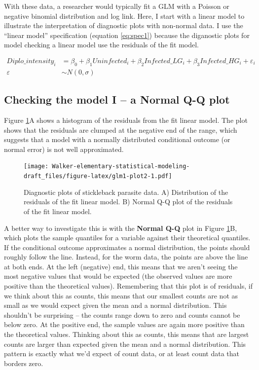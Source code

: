 \documentclass[]{book}
\begin{document}
With these data, a researcher would typically fit a GLM with a Poisson
or negative binomial distribution and log link. Here, I start with a
linear model to illustrate the interpretation of diagnostic plots with
non-normal data. I use the ``linear model'' specification (equation
\eqref{eq:spec1}) because the diganostic plots for model checking a linear
model use the residuals of the fit model.

\begin{align}
Diplo\_intensity_i &= \beta_0 + \beta_1 Uninfected_i + \beta_2 Infected\_LG_i + \beta_3 Infected\_HG_i + \varepsilon_i \\
\varepsilon &\sim N(0, \sigma)
\label{eq:worm-lm}
\end{align}

\subsection{Checking the model I -- a Normal Q-Q
plot}\label{checking-the-model-i-a-normal-q-q-plot}

Figure \ref{fig:glm1-plot2}A shows a histogram of the residuals from the
fit linear model. The plot shows that the residuals are clumped at the
negative end of the range, which suggests that a model with a normally
distributed conditional outcome (or normal error) is not well
approximated.

\begin{figure}
\centering
\texttt{[image: Walker-elementary-statistical-modeling-draft\_files/figure-latex/glm1-plot2-1.pdf]}
\caption{\label{fig:glm1-plot2}Diagnostic plots of stickleback parasite
data. A) Distribution of the residuals of the fit linear model. B)
Normal Q-Q plot of the residuals of the fit linear model.}
\end{figure}

A better way to investigate this is with the \textbf{Normal Q-Q} plot in
Figure \ref{fig:glm1-plot2}B, which plots the sample quantiles for a
variable against their theoretical quantiles. If the conditional outcome
approximates a normal distribution, the points should roughly follow the
line. Instead, for the worm data, the points are above the line at both
ends. At the left (negative) end, this means that we aren't seeing the
most negative values that would be expected (the observed values are
more positive than the theoretical values). Remembering that this plot
is of residuals, if we think about this as counts, this means that our
smallest counts are not as small as we would expect given the mean and a
normal distribution. This shouldn't be surprising -- the counts range
down to zero and counts cannot be below zero. At the positive end, the
sample values are again more positive than the theoretical values.
Thinking about this as counts, this means that are largest counts are
larger than expected given the mean and a normal distribution. This
pattern is exactly what we'd expect of count data, or at least count
data that borders zero.
\end{document}
